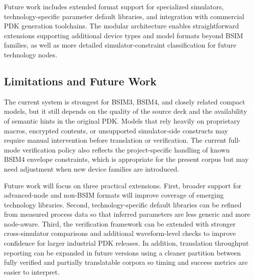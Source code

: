 \documentclass[10pt,twocolumn]{article}
\begin{document}
Future work includes extended format support for specialized simulators, technology-specific parameter default libraries, and integration with commercial PDK generation toolchains. The modular architecture enables straightforward extensions supporting additional device types and model formats beyond BSIM families, as well as more detailed simulator-constraint classification for future technology nodes.

\subsection{Limitations and Future Work}

The current system is strongest for BSIM3, BSIM4, and closely related compact models, but it still depends on the quality of the source deck and the availability of semantic hints in the original PDK. Models that rely heavily on proprietary macros, encrypted contents, or unsupported simulator-side constructs may require manual intervention before translation or verification. The current full-mode verification policy also reflects the project-specific handling of known BSIM4 envelope constraints, which is appropriate for the present corpus but may need adjustment when new device families are introduced.

Future work will focus on three practical extensions. First, broader support for advanced-node and non-BSIM formats will improve coverage of emerging technology libraries. Second, technology-specific default libraries can be refined from measured process data so that inferred parameters are less generic and more node-aware. Third, the verification framework can be extended with stronger cross-simulator comparisons and additional waveform-level checks to improve confidence for larger industrial PDK releases. In addition, translation throughput reporting can be expanded in future versions using a cleaner partition between fully verified and partially translatable corpora so timing and success metrics are easier to interpret.
\end{document}

